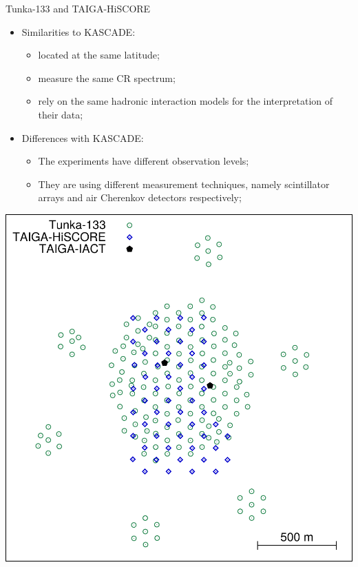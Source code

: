 
%

\begin{frame}{Tunka-133 and TAIGA-HiSCORE}
\begin{minipage}[c]{0.49\textwidth}
\begin{itemize}
  \item Similarities to KASCADE:
  \begin{itemize}
    \item located at the same latitude;
    \item measure the same CR spectrum;
    \item rely on the same hadronic interaction models for the interpretation of their data;
  \end{itemize}
  \item Differences with KASCADE:
  \begin{itemize}
    \item The experiments have different observation levels;
    \item They are using different measurement techniques, namely scintillator arrays and air Cherenkov detectors respectively;
  \end{itemize}
\end{itemize}
\end{minipage}
\hfill
\begin{minipage}[c]{0.45\textwidth}
\includegraphics[width=1\textwidth]{pics/taiga_map_133_hiscore.pdf}
\end{minipage}

\end{frame}

